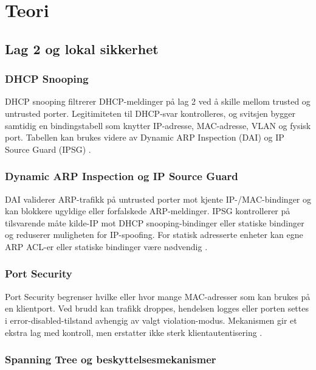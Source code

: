 
\section{Teori}

\subsection{Lag 2 og lokal sikkerhet}

\subsubsection{DHCP Snooping}

DHCP snooping filtrerer DHCP-meldinger på lag 2 ved å skille mellom trusted og untrusted porter. Legitimiteten til DHCP-svar kontrolleres, og svitsjen bygger samtidig en bindingstabell som knytter IP-adresse, MAC-adresse, VLAN og fysisk port. Tabellen kan brukes videre av Dynamic ARP Inspection (DAI) og IP Source Guard (IPSG) \cite{forsvaret_nettverk_rolle1}.
    
\subsubsection{Dynamic ARP Inspection og IP Source Guard}

DAI validerer ARP-trafikk på untrusted porter mot kjente IP-/MAC-bindinger og kan blokkere ugyldige eller forfalskede ARP-meldinger. IPSG kontrollerer på tilsvarende måte kilde-IP mot DHCP snooping-bindinger eller statiske bindinger og reduserer muligheten for IP-spoofing. For statisk adresserte enheter kan egne ARP ACL-er eller statiske bindinger være nødvendig \cite{forsvaret_nettverk_rolle1}.

\subsubsection{Port Security}

Port Security begrenser hvilke eller hvor mange MAC-adresser som kan brukes på en klientport. Ved brudd kan trafikk droppes, hendelsen logges eller porten settes i error-disabled-tilstand avhengig av valgt violation-modus. Mekanismen gir et ekstra lag med kontroll, men erstatter ikke sterk klientautentisering \cite{forsvaret_nettverk_rolle1}.

\subsubsection{Spanning Tree og beskyttelsesmekanismer}

